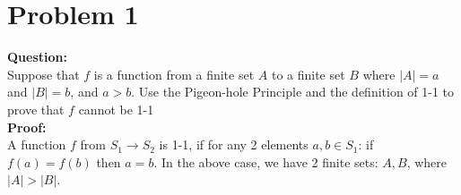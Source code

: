 \documentclass[11pt]{article}
\begin{document}
\section*{Problem 1}

\textbf{Question: }\\
Suppose that $f$ is a function from a finite set $A$ to a finite set $B$ where $|A|=a$ and $|B|=b$, and $a>b$. Use the Pigeon-hole Principle and the definition of 1-1 to prove that $f$ cannot be 1-1
\\\textbf{Proof: }\\
A function $f$ from $S_1 \rightarrow S_2$ is 1-1, if for any 2 elements $a, b \in S_1$: if $f(a)=f(b)$ then $a = b$. In the above case, we have 2 finite sets: $A, B$, where $|A| > |B|$.
\end{document}
